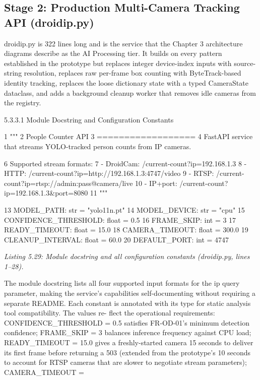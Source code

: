 \subsection{Stage 2: Production Multi-Camera Tracking API (droidip.py)}


droidip.py is 322 lines long and is the service that the Chapter 3 architecture diagrams
describe as the AI Processing tier. It builds on every pattern established in the prototype but
replaces integer device-index inputs with source-string resolution, replaces raw per-frame
box counting with ByteTrack-based identity tracking, replaces the loose dictionary state
with a typed CameraState dataclass, and adds a background cleanup worker that removes
idle cameras from the registry.


5.3.3.1 Module Docstring and Conﬁguration Constants





1 """
2 People Counter API
3 ==================
4 FastAPI service that streams YOLO-tracked person counts from IP cameras.

6 Supported stream formats:
7 - DroidCam: /current-count?ip=192.168.1.3
8 - HTTP: /current-count?ip=http://192.168.1.3:4747/video
9 - RTSP: /current-count?ip=rtsp://admin:pass@camera/live
10 - IP+port: /current-count?ip=192.168.1.3\&port=8080
11 """

13 MODEL\_PATH: str = "yolo11n.pt"
14 MODEL\_DEVICE: str = "cpu"
15 CONFIDENCE\_THRESHOLD: float = 0.5
16 FRAME\_SKIP: int = 3
17 READY\_TIMEOUT: float = 15.0
18 CAMERA\_TIMEOUT: float = 300.0
19 CLEANUP\_INTERVAL: float = 60.0
20 DEFAULT\_PORT: int = 4747



\textit{Listing 5.29: Module docstring and all conﬁguration constants (droidip.py, lines 1--28).}




The module docstring lists all four supported input formats for the ip query parameter,
making the service's capabilities self-documenting without requiring a separate README.
Each constant is annotated with its type for static analysis tool compatibility. The values re-
ﬂect the operational requirements: CONFIDENCE\_THRESHOLD = 0.5 satisﬁes FR-OD-01's
minimum detection conﬁdence; FRAME\_SKIP = 3 balances inference frequency against
CPU load; READY\_TIMEOUT = 15.0 gives a freshly-started camera 15 seconds to deliver
its ﬁrst frame before returning a 503 (extended from the prototype's 10 seconds to account
for RTSP cameras that are slower to negotiate stream parameters); CAMERA\_TIMEOUT =

